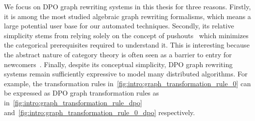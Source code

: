    We focus on DPO graph rewriting systems in this thesis for three reasons.
   Firstly, it is among the most studied algebraic graph rewriting formalisms, which means a large potential user base for our automated techniques.
   Secondly, its relative simplicity stems from relying solely on the concept of pushouts~\cite{pierce1991basic} which minimizes the categorical prerequisites required to understand it. This is interesting because the abstract nature of category theory is often seen as a barrier to entry for newcomers~\cite{overbeekthesis}.
    Finally, despite its conceptual simplicity, DPO graph rewriting systems remain sufficiently expressive to model many distributed algorithms.
    For example, the transformation rules in~\autoref{fig:intro:graph_transformation_rule_0} can be expressed as DPO graph transformation rules as in~\autoref{fig:intro:graph_transformation_rule_dpo} and~\autoref{fig:intro:graph_transformation_rule_0_dpo} respectively.
  
     \begin{figure}[!htbp]
    \centering
    \caption{}
    \label{fig:intro:graph_transformation_rule_0_dpo}
    \end{figure}
    

